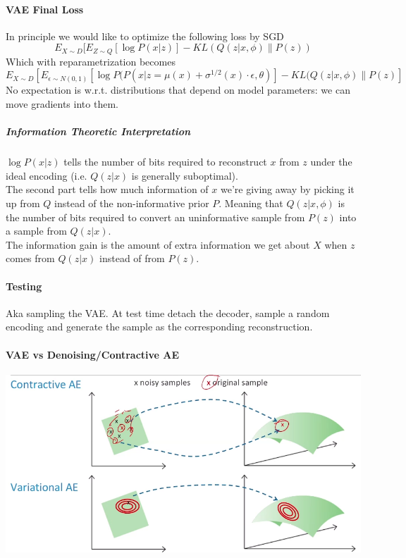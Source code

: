 \documentclass[10pt]{report}
\begin{document}
\paragraph{VAE Final Loss} In principle we would like to optimize the following loss by SGD
$$E_{X\sim D}[E_{Z\sim Q}[\log P(x|z)]-KL(Q(z|x,\phi)\|P(z))$$
Which with reparametrization becomes
$$E_{X\sim D}[E_{\epsilon\sim N(0,1)}[\log P(P(x|z=\mu(x)+\sigma^{1/2}(x)\cdot\epsilon,\theta)]- KL(Q(z|x,\phi)\|P(z)]$$
No expectation is w.r.t. distributions that depend on model parameters: we can move gradients into them.
\subparagraph{Information Theoretic Interpretation}
$\log P(x|z)$ tells the number of bits required to reconstruct $x$ from $z$ under the ideal encoding (i.e. $Q(z|x)$ is generally suboptimal).\\
The second part tells how much information of $x$ we're giving away by picking it up from $Q$ instead of the non-informative prior $P$. Meaning that $Q(z|x,\phi)$ is the number of bits required to convert an uninformative sample from $P(z)$ into a sample from $Q(z|x)$.\\
The information gain is the amount of extra information we get about $X$ when $z$ comes from $Q(z|x)$ instead of from $P(z)$.
\paragraph{Testing} Aka sampling the VAE. At test time detach the decoder, sample a random encoding and generate the sample as the corresponding reconstruction.
\paragraph{VAE vs Denoising/Contractive AE}
\begin{center}
	\includegraphics[scale=0.5]{145.png}
\end{center}
\end{document}
